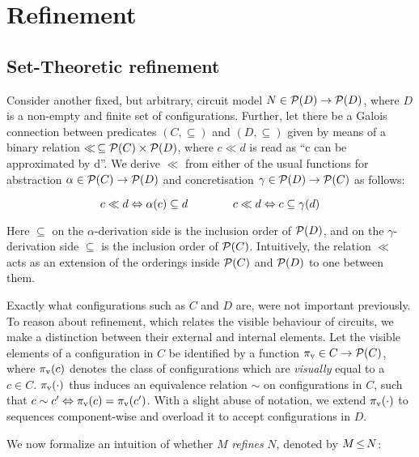 \section{Refinement}

\subsection{Set-Theoretic refinement}

Consider another fixed, but arbitrary, circuit model $N \in \mathcal{P}(D) \rightarrow \mathcal{P}(D)$, where $D$ is a non-empty and finite set of configurations. Further, let there be a Galois connection between predicates $(C, \subseteq)$ and $(D, \subseteq)$ given by means of a binary relation $\ll \, \subseteq \mathcal{P}(C) \times \mathcal{P}(D)$, where $c \ll d$ is read as ``c can be approximated by d''. We derive $\ll$ from either of the usual functions for abstraction $\alpha \in \mathcal{P}(C) \rightarrow \mathcal{P}(D)$ and concretisation $\gamma \in \mathcal{P}(D) \rightarrow \mathcal{P}(C)$ as follows:

\begin{equation*}
c \ll d \Leftrightarrow \alpha(c) \subseteq d \quad\quad\quad\quad c \ll d \Leftrightarrow c \subseteq \gamma(d)
\end{equation*}

\noindent Here $\subseteq$ on the $\alpha$-derivation side is the inclusion order of $\mathcal{P}(D)$, and on the $\gamma$-derivation side $\subseteq$ is the inclusion order of $\mathcal{P}(C)$. Intuitively, the relation $\ll$ acts as an extension of the orderings inside $\mathcal{P}(C)$ and $\mathcal{P}(D)$ to one between them.

Exactly what configurations such as $C$ and $D$ are, were not important previously. To reason about refinement, which relates the visible behaviour of circuits, we make a distinction between their external and internal elements. Let the visible elements of a configuration in $C$ be identified by a function $\pi_{\textrm{v}} \in C \rightarrow \mathcal{P}(C)$, where $\pi_{\textrm{v}}(c)$ denotes the class of configurations which are \textit{visually} equal to a $c \in C$. $\pi_{\textrm{v}}(\cdot)$ thus induces an equivalence relation $\sim$ on configurations in $C$, such that $c \sim c' \Leftrightarrow \pi_{\textrm{v}}(c) = \pi_{\textrm{v}}(c')$. With a slight abuse of notation, we extend $\pi_{\textrm{v}}(\cdot)$ to sequences component-wise and overload it to accept configurations in $D$.


We now formalize an intuition of whether $M$ \textit{refines} $N$, denoted by $M \operatorname{\leq} N$:

